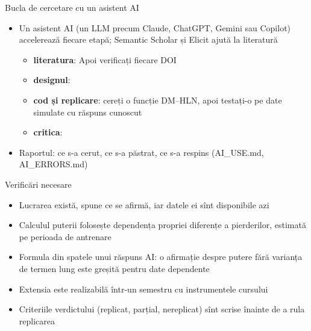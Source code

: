 \begin{frame}{Bucla de cercetare cu un asistent AI}
\itemsize{\footnotesize}
\begin{itemize}
    \item Un asistent AI (un LLM precum Claude, ChatGPT, Gemini sau Copilot) accelerează fiecare etapă; Semantic Scholar și Elicit ajută la literatură
    \begin{itemize}
        \item \textbf{literatura}:  Apoi verificați fiecare DOI
        \item \textbf{designul}: 
        \item \textbf{cod și replicare}: cereți o funcție DM--HLN, apoi testați-o pe date simulate cu răspuns cunoscut
        \item \textbf{critica}: 
    \end{itemize}
    \item Raportul: ce s-a cerut, ce s-a păstrat, ce s-a respins (AI\_USE.md, AI\_ERRORS.md)
\end{itemize}
\end{frame}

\begin{frame}{Verificări necesare}
\itemsize{\small}
\begin{itemize}
    \item Lucrarea există, spune ce se afirmă, iar datele ei sînt disponibile azi
    \item Calculul puterii folosește dependența propriei diferențe a pierderilor, estimată pe perioada de antrenare
    \item Formula din spatele unui răspuns AI: o afirmație despre putere fără varianța de termen lung este greșită pentru date dependente
    \item Extensia este realizabilă într-un semestru cu instrumentele cursului
    \item Criteriile verdictului (replicat, parțial, nereplicat) sînt scrise înainte de a rula replicarea
\end{itemize}
\end{frame}

